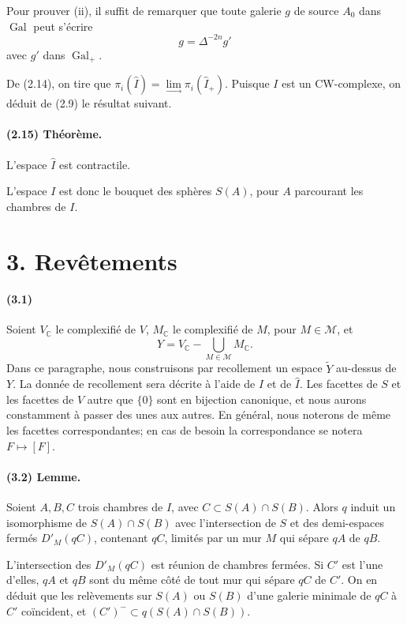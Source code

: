 \documentclass[10pt,a4paper]{article}
\newcommand{\C}{\mathbb C}
\providecommand{\varinjlim}{\mathop{\mathrm{lim}}\limits_{\longrightarrow}}
\begin{document}
Pour prouver (ii), il suffit de remarquer que toute galerie \(g\) de source \(A_0\) dans \(\operatorname{Gal}\) peut s'écrire
\[
g=\Delta^{-2n}g'
\]
avec \(g'\) dans \(\operatorname{Gal}_+\).

De (2.14), on tire que \(\pi_i(\widehat I)=\varinjlim\pi_i(\widehat I_+)\). Puisque \(I\) est un CW-complexe, on déduit de (2.9) le résultat suivant.

\paragraph{(2.15) Théorème.} L'espace \(\widehat I\) est contractile.

L'espace \(I\) est donc le bouquet des sphères \(S(A)\), pour \(A\) parcourant les chambres de \(I\).

\section*{3. Revêtements}

\paragraph{(3.1)} Soient \(V_\C\) le complexifié de \(V\), \(M_\C\) le complexifié de \(M\), pour \(M\in\mathcal M\), et
\[
Y=V_\C-\bigcup_{M\in\mathcal M}M_\C.
\]
Dans ce paragraphe, nous construisons par recollement un espace \(\widetilde Y\) au-dessus de \(Y\). La donnée de recollement sera décrite à l'aide de \(I\) et de \(\widehat I\). Les facettes de \(S\) et les facettes de \(V\) autre que \(\{0\}\) sont en bijection canonique, et nous aurons constamment à passer des unes aux autres. En général, nous noterons de même les facettes correspondantes; en cas de besoin la correspondance se notera \(F\mapsto [F]\).

\paragraph{(3.2) Lemme.} Soient \(A,B,C\) trois chambres de \(I\), avec \(C\subset S(A)\cap S(B)\). Alors \(q\) induit un isomorphisme de \(S(A)\cap S(B)\) avec l'intersection de \(S\) et des demi-espaces fermés \(D'_M(qC)\), contenant \(qC\), limités par un mur \(M\) qui sépare \(qA\) de \(qB\).

L'intersection des \(D'_M(qC)\) est réunion de chambres fermées. Si \(C'\) est l'une d'elles, \(qA\) et \(qB\) sont du même côté de tout mur qui sépare \(qC\) de \(C'\). On en déduit que les relèvements sur \(S(A)\) ou \(S(B)\) d'une galerie minimale de \(qC\) à \(C'\) coïncident, et \((C')^{-}\subset q(S(A)\cap S(B))\).
\end{document}
